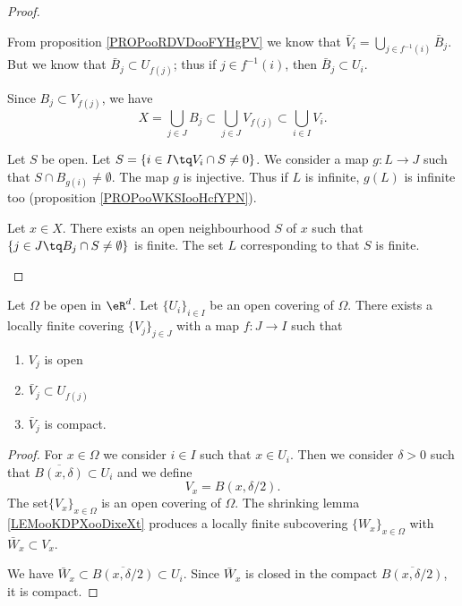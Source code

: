 \begin{proof}
\begin{subproof}
		From proposition \ref{PROPooRDVDooFYHgPV} we know that \( \bar V_i=\bigcup_{j\in f^{-1}(i)}\bar B_j\). But we know that \( \bar B_j\subset U_{f(j)}\); thus if \( j\in f^{-1}(i)\), then \( \bar B_j\subset U_i\).

		\spitem[\( \bigcup_{i\in I}V_i=X\)]
		Since \( B_j\subset V_{f(j)}\), we have
		\begin{equation}
			X=\bigcup_{j\in J}B_j\subset\bigcup_{j\in J}V_{f(j)}\subset\bigcup_{i\in I}V_i.
		\end{equation}

		Let \( S\) be open. Let \( S=\{ i\in I\tq V_i\cap S\neq 0 \}\). We consider a map \(g \colon L\to J  \) such that \( S\cap B_{g(i)}\neq \emptyset\). The map \( g\) is injective. Thus if \( L\) is infinite, \( g(L)\) is infinite too (proposition \ref{PROPooWKSIooHcfYPN}).

		Let \( x\in X\). There exists an open neighbourhood \( S\) of \( x\) such that \( \{ j\in J\tq B_j\cap S\neq\emptyset \}\) is finite. The set \( L\) corresponding to that \( S\) is finite.
	\end{subproof}
\end{proof}

\begin{proposition}	\label{PROPooCXATooMLdiKy}
	Let \( \Omega\) be open in \( \eR^d\). Let \( \{ U_i \}_{i\in I}\) be an open covering of \( \Omega\). There exists a locally finite covering \( \{ V_j \}_{j\in J}\) with a map \(f \colon J\to I  \) such that
	\begin{enumerate}
		\item
		      \( V_j\) is open
		\item
		      \( \bar V_j\subset U_{f(j)}\)
		\item
		      \( \bar V_j\) is compact.
	\end{enumerate}
\end{proposition}

\begin{proof}
	For \( x\in \Omega\) we consider \( i\in I\) such that \( x\in U_i\). Then we consider \( \delta>0\) such that \( \overline{B(x,\delta)}\subset U_i\) and we define
	\begin{equation}
		V_x=B(x,\delta/2).
	\end{equation}
	The set\( \{ V_x \}_{x\in \Omega}\) is an open covering of \( \Omega\). The shrinking lemma \ref{LEMooKDPXooDixeXt} produces a locally finite subcovering \( \{ W_x \}_{x\in \Omega}\) with \( \bar W_x\subset V_x\).

	We have \( \bar W_x\subset\overline{B(x,\delta/2)}\subset U_i\). Since \( \bar W_x\) is closed in the compact \( \overline{B(x,\delta/2)}\), it is compact.
\end{proof}

